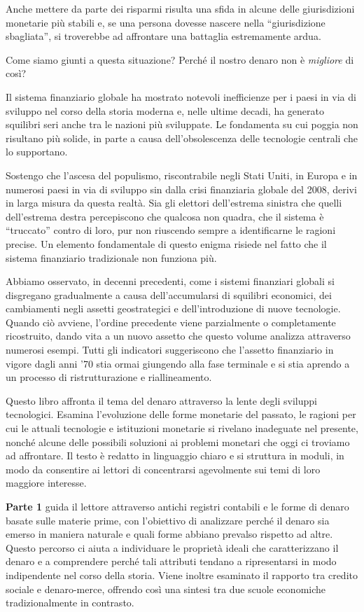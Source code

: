 \documentclass[
  a5paper,
  smalldemyvopaper,10pt,twoside,onecolumn,openright,extrafontsizes,hidelinks]{memoir}
\begin{document}
Anche mettere da parte dei risparmi risulta una sfida in alcune delle
giurisdizioni monetarie più stabili e, se una persona dovesse nascere
nella ``giurisdizione sbagliata'', si troverebbe ad affrontare una
battaglia estremamente ardua.

Come siamo giunti a questa situazione? Perché il nostro denaro non è
\emph{migliore} di così?

Il sistema finanziario globale ha mostrato notevoli inefficienze per i
paesi in via di sviluppo nel corso della storia moderna e, nelle ultime
decadi, ha generato squilibri seri anche tra le nazioni più sviluppate.
Le fondamenta su cui poggia non risultano più solide, in parte a causa
dell'obsolescenza delle tecnologie centrali che lo supportano.

Sostengo che l'ascesa del populismo, riscontrabile negli Stati Uniti, in
Europa e in numerosi paesi in via di sviluppo sin dalla crisi
finanziaria globale del 2008, derivi in larga misura da questa realtà.
Sia gli elettori dell'estrema sinistra che quelli dell'estrema destra
percepiscono che qualcosa non quadra, che il sistema è ``truccato''
contro di loro, pur non riuscendo sempre a identificarne le ragioni
precise. Un elemento fondamentale di questo enigma risiede nel fatto che
il sistema finanziario tradizionale non funziona più.

Abbiamo osservato, in decenni precedenti, come i sistemi finanziari
globali si disgregano gradualmente a causa dell'accumularsi di squilibri
economici, dei cambiamenti negli assetti geostrategici e
dell'introduzione di nuove tecnologie. Quando ciò avviene, l'ordine
precedente viene parzialmente o completamente ricostruito, dando vita a
un nuovo assetto che questo volume analizza attraverso numerosi esempi.
Tutti gli indicatori suggeriscono che l'assetto finanziario in vigore
dagli anni '70 stia ormai giungendo alla fase terminale e si stia
aprendo a un processo di ristrutturazione e riallineamento.

Questo libro affronta il tema del denaro attraverso la lente degli
sviluppi tecnologici. Esamina l'evoluzione delle forme monetarie del
passato, le ragioni per cui le attuali tecnologie e istituzioni
monetarie si rivelano inadeguate nel presente, nonché alcune delle
possibili soluzioni ai problemi monetari che oggi ci troviamo ad
affrontare. Il testo è redatto in linguaggio chiaro e si struttura in
moduli, in modo da consentire ai lettori di concentrarsi agevolmente sui
temi di loro maggiore interesse.

\textbf{Parte 1} guida il lettore attraverso antichi registri contabili
e le forme di denaro basate sulle materie prime, con l'obiettivo di
analizzare perché il denaro sia emerso in maniera naturale e quali forme
abbiano prevalso rispetto ad altre. Questo percorso ci aiuta a
individuare le proprietà ideali che caratterizzano il denaro e a
comprendere perché tali attributi tendano a ripresentarsi in modo
indipendente nel corso della storia. Viene inoltre esaminato il rapporto
tra credito sociale e denaro-merce, offrendo così una sintesi tra due
scuole economiche tradizionalmente in contrasto.
\end{document}

